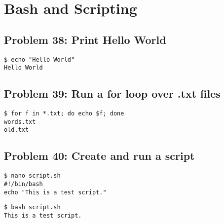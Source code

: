 \section{Bash and Scripting}

\subsection*{Problem 38: Print Hello World}
\begin{verbatim}
$ echo "Hello World"
Hello World
\end{verbatim}

\subsection*{Problem 39: Run a for loop over .txt files}
\begin{verbatim}
$ for f in *.txt; do echo $f; done
words.txt
old.txt
\end{verbatim}

\subsection*{Problem 40: Create and run a script}
\begin{verbatim}
$ nano script.sh
#!/bin/bash
echo "This is a test script."
\end{verbatim}

\begin{verbatim}
$ bash script.sh
This is a test script.
\end{verbatim}


